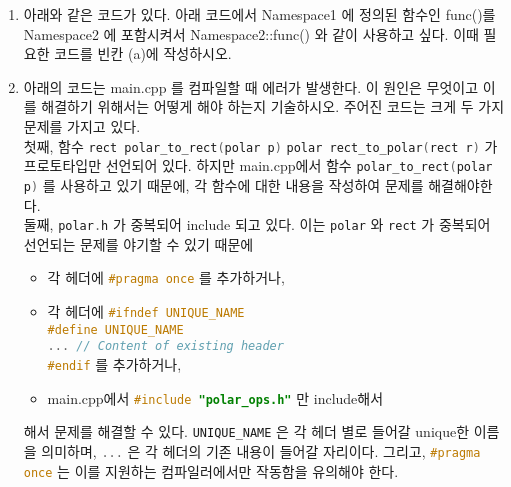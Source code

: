 \documentclass{article}
\newcommand{\inline}[1]{%
    \colorbox{beta-gray}{\lstinline[language=C++]{#1}}%
}
\begin{document}
\begin{enumerate}[itemsep=30pt]
        \item 아래와 같은 코드가 있다. 아래 코드에서 Namespace1 에 정의된 함수인 func()를 Namespace2 에 포함시켜서 Namespace2::func() 와 같이 사용하고 싶다. 이때 필요한 코드를 빈칸 (a)에 작성하시오.
        \item 아래의 코드는 main.cpp 를 컴파일할 때 에러가 발생한다. 이 원인은 무엇이고 이를 해결하기 위해서는 어떻게 해야 하는지 기술하시오.
              주어진 코드는 크게 두 가지 문제를 가지고 있다. \\
              첫째, 함수 \inline{rect polar_to_rect(polar p)}\inline{polar rect_to_polar(rect r)}가 프로토타입만 선언되어 있다.
              하지만\; main.cpp에서 함수 \inline{polar_to_rect(polar p)}를 사용하고 있기 때문에, 각 함수에 대한 내용을 작성하여 문제를 해결해야한다. \\
              둘째, \inline{polar.h}가 중복되어 include 되고 있다. 이는 \inline{polar}와 \inline{rect}가 중복되어 선언되는 문제를 야기할 수 있기 때문에
              \begin{itemize}
                  \item 각 헤더에 \inline{#pragma once}를 추가하거나,
                  \item 각 헤더에 \inline{#ifndef UNIQUE_NAME}\\\inline{#define UNIQUE_NAME}\\\inline{... // Content of existing header}\\\inline{#endif}를 추가하거나,
                  \item main.cpp에서 \inline{#include "polar_ops.h"}만 include해서
              \end{itemize}해서 문제를 해결할 수 있다. \inline{UNIQUE_NAME}은 각 헤더 별로 들어갈 unique한 이름을 의미하며, \inline{...}은 각 헤더의 기존 내용이 들어갈 자리이다. 그리고, \inline{#pragma once}는 이를 지원하는 컴파일러에서만 작동함을 유의해야 한다.


\end{enumerate}
\end{document}

